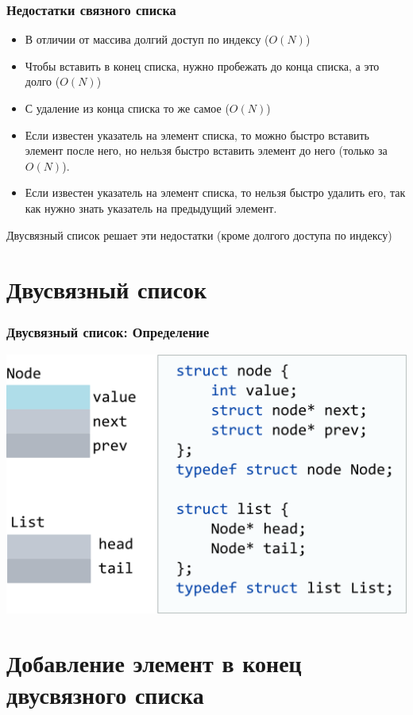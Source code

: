 \documentclass[10pt,pdf,hyperref={unicode}]{beamer}
\begin{document}
\begin{frame}[fragile]
\frametitle{Недостатки связного списка}
\begin{itemize}
\item В отличии от массива долгий доступ по индексу ($O(N)$)
\item Чтобы вставить в конец списка, нужно пробежать до конца списка, а это долго ($O(N)$)
\item С удаление из конца списка то же самое ($O(N)$)
\item Если известен указатель на элемент списка, то можно быстро вставить элемент после него, но нельзя быстро вставить элемент до него (только за $O(N)$).
\item Если известен указатель на элемент списка, то нельзя быстро удалить его, так как нужно знать указатель на предыдущий элемент.
\end{itemize}
Двусвязный список решает эти недостатки (кроме долгого доступа по индексу)
\end{frame}
\section{Двусвязный список}

\begin{frame}[fragile]
\frametitle{Двусвязный список: Определение}
\begin{center}
\includegraphics[width=\imageSizeMult\linewidth]{../images/doublylist/doublylist_definition.png}
\end{center}
\end{frame}

\section{Добавление элемент в конец двусвязного списка}
\end{document}
